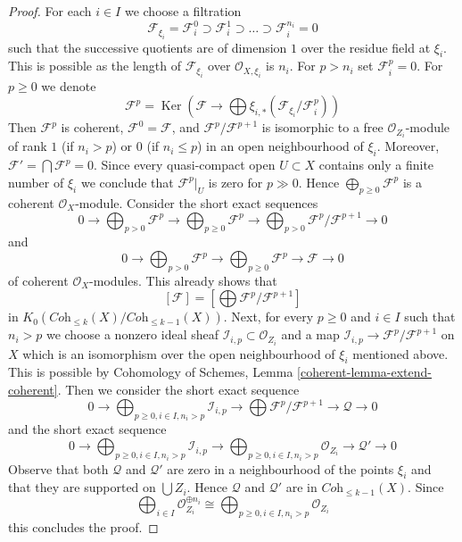\documentclass[10pt,a4paper]{amsart}
\theoremstyle{plain}
\theoremstyle{definition}
\theoremstyle{remark}
\numberwithin{equation}{subsection}
\def\Ker{\mathop{\mathrm{Ker}}}
\begin{document}
\begin{proof}
\medskip\noindent
For each $i \in I$ we choose a filtration
$$
\mathcal{F}_{\xi_i} = \mathcal{F}_i^0 \supset \mathcal{F}_i^1 \supset
\ldots \supset \mathcal{F}_i^{n_i} = 0
$$
such that the successive quotients are of dimension $1$ over the residue
field at $\xi_i$. This is possible as the length of $\mathcal{F}_{\xi_i}$
over $\mathcal{O}_{X, \xi_i}$ is $n_i$.
For $p > n_i$ set $\mathcal{F}_i^p = 0$. For $p \geq 0$ we denote
$$
\mathcal{F}^p =
\Ker\left(\mathcal{F} \longrightarrow \bigoplus
\xi_{i, *}(\mathcal{F}_{\xi_i}/\mathcal{F}_i^p)\right)
$$
Then $\mathcal{F}^p$ is coherent, $\mathcal{F}^0 = \mathcal{F}$, and
$\mathcal{F}^p/\mathcal{F}^{p + 1}$ is isomorphic to a free
$\mathcal{O}_{Z_i}$-module of rank $1$ (if $n_i > p$) or $0$
(if $n_i \leq p$) in an open neighbourhood of $\xi_i$. Moreover,
$\mathcal{F}' = \bigcap \mathcal{F}^p = 0$. Since every quasi-compact
open $U \subset X$ contains only a finite number of $\xi_i$
we conclude that $\mathcal{F}^p|_U$ is zero for $p \gg 0$.
Hence $\bigoplus_{p \geq 0} \mathcal{F}^p$ is a coherent
$\mathcal{O}_X$-module. Consider the short exact sequences
$$
0 \to
\bigoplus\nolimits_{p > 0} \mathcal{F}^p \to
\bigoplus\nolimits_{p \geq 0} \mathcal{F}^p \to
\bigoplus\nolimits_{p > 0} \mathcal{F}^p/\mathcal{F}^{p + 1} \to 0
$$
and
$$
0 \to
\bigoplus\nolimits_{p > 0} \mathcal{F}^p \to
\bigoplus\nolimits_{p \geq 0} \mathcal{F}^p \to
\mathcal{F} \to 0
$$
of coherent $\mathcal{O}_X$-modules. This already shows that
$$
[\mathcal{F}] = [\bigoplus \mathcal{F}^p/\mathcal{F}^{p + 1}]
$$
in $K_0(\textit{Coh}_{\leq k}(X)/\textit{Coh}_{\leq k - 1}(X))$.
Next, for every $p \geq 0$ and $i \in I$ such that $n_i > p$
we choose a nonzero ideal sheaf $\mathcal{I}_{i, p} \subset \mathcal{O}_{Z_i}$
and a map $\mathcal{I}_{i, p} \to \mathcal{F}^p/\mathcal{F}^{p + 1}$ on $X$
which is an isomorphism over the open neighbourhood of $\xi_i$
mentioned above. This is possible by
Cohomology of Schemes, Lemma \ref{coherent-lemma-extend-coherent}.
Then we consider the short exact sequence
$$
0 \to
\bigoplus\nolimits_{p \geq 0, i \in I, n_i > p} \mathcal{I}_{i, p}
\to
\bigoplus \mathcal{F}^p/\mathcal{F}^{p + 1} \to
\mathcal{Q} \to 0
$$
and the short exact sequence
$$
0 \to
\bigoplus\nolimits_{p \geq 0, i \in I, n_i > p} \mathcal{I}_{i, p}
\to
\bigoplus\nolimits_{p \geq 0, i \in I, n_i > p} \mathcal{O}_{Z_i}
\to
\mathcal{Q}' \to 0
$$
Observe that both $\mathcal{Q}$ and $\mathcal{Q}'$ are zero in a neighbourhood
of the points $\xi_i$ and that they are supported on $\bigcup Z_i$.
Hence $\mathcal{Q}$ and $\mathcal{Q}'$ are in
$\textit{Coh}_{\leq k - 1}(X)$.
Since
$$
\bigoplus\nolimits_{i \in I} \mathcal{O}_{Z_i}^{\oplus n_i} \cong
\bigoplus\nolimits_{p \geq 0, i \in I, n_i > p} \mathcal{O}_{Z_i}
$$
this concludes the proof.
\end{proof}
\end{document}

